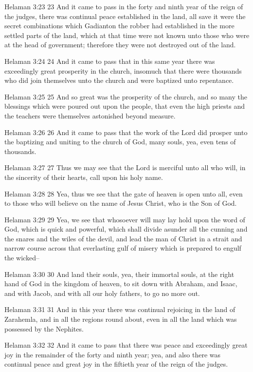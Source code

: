 Helaman 3:23
 23 And it came to pass in the forty and ninth year of the reign
of the judges, there was continual peace established in the land,
all save it were the secret combinations which Gadianton the
robber had established in the more settled parts of the land,
which at that time were not known unto those who were at the head
of government; therefore they were not destroyed out of the land.

Helaman 3:24
 24 And it came to pass that in this same year there was
exceedingly great prosperity in the church, insomuch that there
were thousands who did join themselves unto the church and were
baptized unto repentance.

Helaman 3:25
 25 And so great was the prosperity of the church, and so many
the blessings which were poured out upon the people, that even
the high priests and the teachers were themselves astonished
beyond measure.

Helaman 3:26
 26 And it came to pass that the work of the Lord did prosper
unto the baptizing and uniting to the church of God, many souls,
yea, even tens of thousands.

Helaman 3:27
 27 Thus we may see that the Lord is merciful unto all who will,
in the sincerity of their hearts, call upon his holy name.

Helaman 3:28
 28 Yea, thus we see that the gate of heaven is open unto all,
even to those who will believe on the name of Jesus Christ, who
is the Son of God.

Helaman 3:29
 29 Yea, we see that whosoever will may lay hold upon the word of
God, which is quick and powerful, which shall divide asunder all
the cunning and the snares and the wiles of the devil, and lead
the man of Christ in a strait and narrow course across that
everlasting gulf of misery which is prepared to engulf the
wicked--

Helaman 3:30
 30 And land their souls, yea, their immortal souls, at the right
hand of God in the kingdom of heaven, to sit down with Abraham,
and Isaac, and with Jacob, and with all our holy fathers, to go
no more out.

Helaman 3:31
 31 And in this year there was continual rejoicing in the land of
Zarahemla, and in all the regions round about, even in all the
land which was possessed by the Nephites.

Helaman 3:32
 32 And it came to pass that there was peace and exceedingly
great joy in the remainder of the forty and ninth year; yea, and
also there was continual peace and great joy in the fiftieth year
of the reign of the judges.

